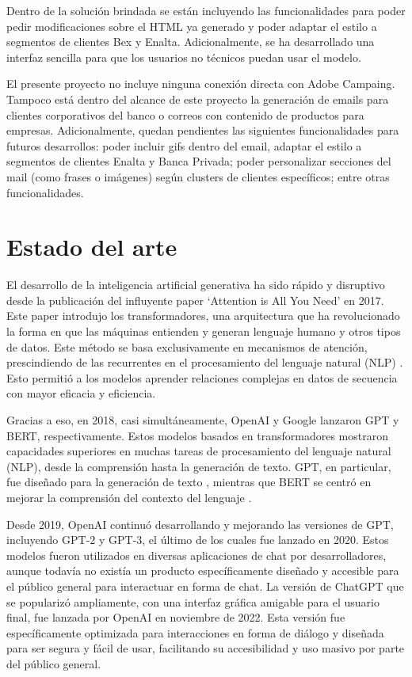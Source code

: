 Dentro de la solución brindada se están incluyendo las funcionalidades para poder pedir modificaciones sobre el HTML ya generado y poder adaptar el estilo a segmentos de clientes Bex y Enalta. Adicionalmente, se ha desarrollado una interfaz sencilla para que los usuarios no técnicos puedan usar el modelo.

El presente proyecto no incluye ninguna conexión directa con Adobe Campaing. Tampoco está dentro del alcance de este proyecto la generación de emails para clientes corporativos del banco o correos con contenido de productos para empresas. Adicionalmente, quedan pendientes las siguientes funcionalidades para futuros desarrollos: poder incluir gifs dentro del email, adaptar el estilo a segmentos de clientes Enalta y Banca Privada; poder personalizar secciones del mail (como frases o imágenes) según clusters de clientes específicos; entre otras funcionalidades.


\section{Estado del arte}

El desarrollo de la inteligencia artificial generativa ha sido rápido y disruptivo desde la publicación del influyente paper `Attention is All You Need' en 2017. Este paper introdujo los transformadores, una arquitectura que ha revolucionado la forma en que las máquinas entienden y generan lenguaje humano y otros tipos de datos. Este método se basa exclusivamente en mecanismos de atención, prescindiendo de las recurrentes en el procesamiento del lenguaje natural (NLP) \citep{Vaswani2017}. Esto permitió a los modelos aprender relaciones complejas en datos de secuencia con mayor eficacia y eficiencia.

Gracias a eso, en 2018, casi simultáneamente, OpenAI y Google lanzaron GPT y BERT, respectivamente. Estos modelos basados en transformadores mostraron capacidades superiores en muchas tareas de procesamiento del lenguaje natural (NLP), desde la comprensión hasta la generación de texto. GPT, en particular, fue diseñado para la generación de texto \citep{Radford2018}, mientras que BERT se centró en mejorar la comprensión del contexto del lenguaje \citep{Devlin2018}.

Desde 2019, OpenAI continuó desarrollando y mejorando las versiones de GPT, incluyendo GPT-2 y GPT-3, el último de los cuales fue lanzado en 2020. Estos modelos fueron utilizados en diversas aplicaciones de chat por desarrolladores, aunque todavía no existía un producto específicamente diseñado y accesible para el público general para interactuar en forma de chat. La versión de ChatGPT que se popularizó ampliamente, con una interfaz gráfica amigable para el usuario final, fue lanzada por OpenAI en noviembre de 2022. Esta versión fue específicamente optimizada para interacciones en forma de diálogo y diseñada para ser segura y fácil de usar, facilitando su accesibilidad y uso masivo por parte del público general.\citep{OpenAI2022ChatGPT}

